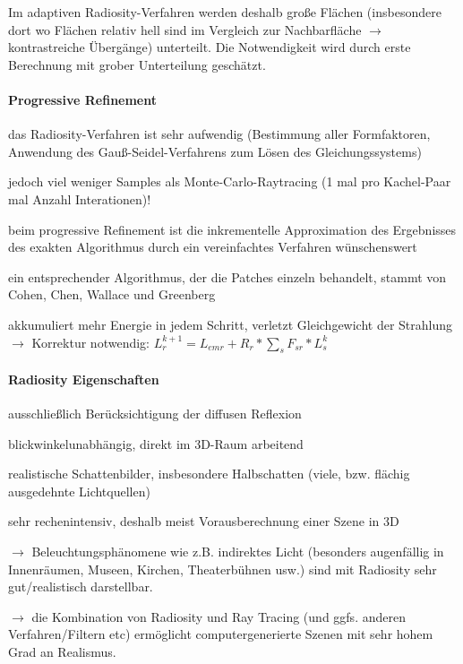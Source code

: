 \documentclass[landscape]{article}
\begin{document}
\begin{multicols}{3}
  Im adaptiven Radiosity-Verfahren werden deshalb große Flächen (insbesondere dort wo Flächen relativ hell sind im Vergleich zur Nachbarfläche $\rightarrow$ kontrastreiche Übergänge) unterteilt. Die Notwendigkeit wird durch erste Berechnung mit grober Unterteilung geschätzt.
  
  \paragraph{Progressive Refinement}
  \begin{itemize*}
    \item das Radiosity-Verfahren ist sehr aufwendig (Bestimmung aller Formfaktoren, Anwendung des Gauß-Seidel-Verfahrens zum Lösen des Gleichungssystems)
    \item jedoch viel weniger Samples als Monte-Carlo-Raytracing (1 mal pro Kachel-Paar mal Anzahl Interationen)!
    \item beim progressive Refinement ist die inkrementelle Approximation des Ergebnisses des exakten Algorithmus durch ein vereinfachtes Verfahren wünschenswert
    \item ein entsprechender Algorithmus, der die Patches einzeln behandelt, stammt von Cohen, Chen, Wallace und Greenberg
    \item akkumuliert mehr Energie in jedem Schritt, verletzt Gleichgewicht der Strahlung $\rightarrow$ Korrektur notwendig:
    $L_r^{k+1}=L_{emr} + R_r*\sum_s F_{sr}* L_s^k$
  \end{itemize*}
  
  
  \paragraph{Radiosity Eigenschaften}
  \begin{itemize*}
    \item ausschließlich Berücksichtigung der diffusen Reflexion
    \item blickwinkelunabhängig, direkt im 3D-Raum arbeitend
    \item realistische Schattenbilder, insbesondere Halbschatten (viele, bzw. flächig ausgedehnte Lichtquellen)
    \item sehr rechenintensiv, deshalb meist Vorausberechnung einer Szene in 3D
    \item $\rightarrow$ Beleuchtungsphänomene wie z.B. indirektes Licht (besonders augenfällig in Innenräumen, Museen, Kirchen, Theaterbühnen usw.) sind mit Radiosity sehr gut/realistisch darstellbar.
    \item $\rightarrow$ die Kombination von Radiosity und Ray Tracing (und ggfs. anderen Verfahren/Filtern etc) ermöglicht computergenerierte Szenen mit sehr hohem Grad an Realismus.
  \end{itemize*}
  

\end{multicols}
\end{document}
